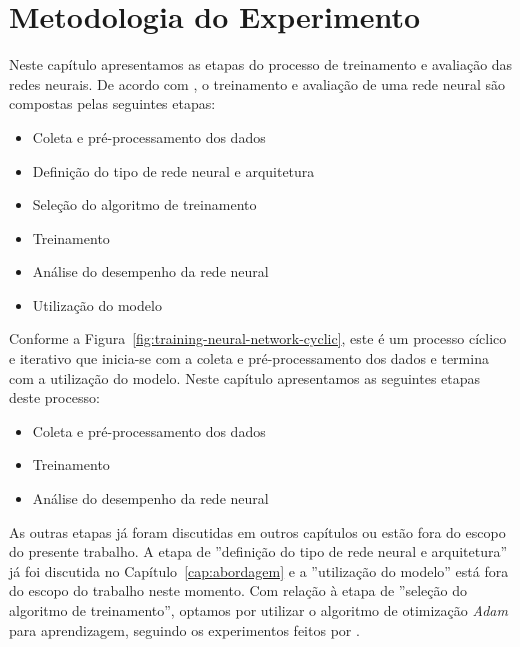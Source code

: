 \chapter{Metodologia do Experimento}
\label{cap:experimento}


Neste capítulo apresentamos as etapas do processo de treinamento e avaliação das redes neurais. De acordo com \cite{nndesign:2014:pratical-training-issues}, o treinamento e avaliação de uma rede neural são compostas pelas seguintes etapas:
\begin{itemize}
    \item Coleta e pré-processamento dos dados
    \item Definição do tipo de rede neural e arquitetura
    \item Seleção do algoritmo de treinamento
    \item Treinamento
    \item Análise do desempenho da rede neural
    \item Utilização do modelo
\end{itemize}

Conforme a Figura~\ref{fig:training-neural-network-cyclic}, este é um processo cíclico e iterativo que inicia-se com a coleta e pré-processamento dos dados e termina com a utilização do modelo. Neste capítulo apresentamos as seguintes etapas deste processo:

\begin{itemize}
    \item Coleta e pré-processamento dos dados
    \item Treinamento
    \item Análise do desempenho da rede neural
\end{itemize}

As outras etapas já foram discutidas em outros capítulos ou estão fora do escopo do presente trabalho. A etapa de ''definição do tipo de rede neural e arquitetura'' já foi discutida no Capítulo~\ref{cap:abordagem} e a ''utilização do modelo'' está fora do escopo do trabalho neste momento. Com relação à etapa de ''seleção do algoritmo de treinamento'', optamos por utilizar o algoritmo de otimização \emph{Adam} para aprendizagem, seguindo os experimentos feitos por \cite{yao-2018}. 



